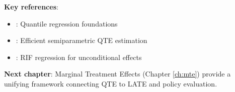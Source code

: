 \textbf{Key references}:
\begin{itemize}
    \item \citet{koenker1978regression}: Quantile regression foundations
    \item \citet{firpo2007efficient}: Efficient semiparametric QTE estimation
    \item \citet{firpo2009unconditional}: RIF regression for unconditional effects
\end{itemize}

\textbf{Next chapter}: Marginal Treatment Effects (Chapter \ref{ch:mte}) provide a unifying framework connecting QTE to LATE and policy evaluation.
